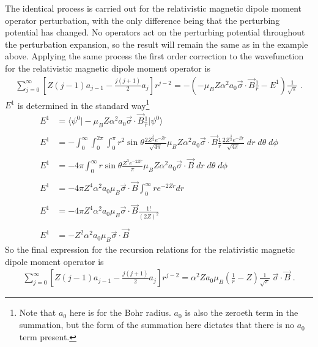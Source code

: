     The identical process is carried out for the relativistic magnetic dipole moment operator perturbation, with the only difference being that the perturbing potential has changed. No operators act on the perturbing potential throughout the perturbation expansion, so the result will remain the same as in the example above. Applying the same process the first order correction to the wavefunction for the relativistic magnetic dipole moment operator is 
    \begin{align}
        \sum_{j = 0}^\infty \left[ Z(j-1)a_{j-1} - \frac{j(j+1)}{2} a_j \right] r^{j-2} = -\left(- \mu_B Z \alpha^2 a_0 \vec{\sigma} \cdot \vec{B} \frac{1}{r} - E^1 \right) \frac{1}{\sqrt{\pi}}\;.
    \end{align}
    \noindent $E^1$ is determined in the standard way\footnote{Note that $a_0$ here is for the Bohr radius. $a_0$ is also the zeroeth term in the summation, but the form of the summation here dictates that there is no $a_0$ term present.}
    \begin{align*}
        E^1 &= \langle \psi^0 \vert - \mu_B Z \alpha^2 a_0 \vec{\sigma} \cdot \vec{B} \frac{1}{r} \vert \psi^0 \rangle \\ \nonumber \\
        E^1 &= -\int_0^\infty \int_0^{2\pi} \int_0^\pi r^2 \sin \theta \frac{2Z^{\frac{3}{2}} e^{-Zr}}{\sqrt{4\pi}} \mu_B Z \alpha^2 a_0 \vec{\sigma} \cdot \vec{B} \frac{1}{r} \frac{2Z^{\frac{3}{2}} e^{-Zr}}{\sqrt{4\pi}}\;dr\;d\theta\;d\phi  \\\nonumber \\
        E^1 &= -4\pi \int_0^\infty r \sin\theta \frac{Z^3 e^{-2Zr}}{\pi}  \mu_B Z \alpha^2 a_0 \vec{\sigma} \cdot \vec{B} \;dr\;d\theta\;d\phi\\\nonumber\\
        E^1 &= - 4\pi Z^4 \alpha^2 a_0 \mu_B \vec{\sigma} \cdot \vec{B} \int_0^\infty r e^{-2Zr} dr \\\nonumber \\
        E^1 &= - 4\pi Z^4 \alpha^2 a_0 \mu_B \vec{\sigma} \cdot \vec{B} \frac{1!}{(2Z)^2} \\\nonumber \\
        E^1 &= - Z^2 \alpha^2 a_0 \mu_B \vec{\sigma} \cdot \vec{B}
    \end{align*}
    \noindent So the final expression for the recursion relations for the relativistic magnetic dipole moment operator is 
    \begin{align}
        \sum_{j = 0}^\infty \left[ Z(j-1)a_{j-1} - \frac{j(j+1)}{2} a_j \right] r^{j-2} = \alpha^2 Z a_0 \mu_B \left(\frac{1}{r} - Z \right) \frac{1}{\sqrt{\pi}}\; \vec{\sigma} \cdot \vec{B}\;.
    \end{align}
